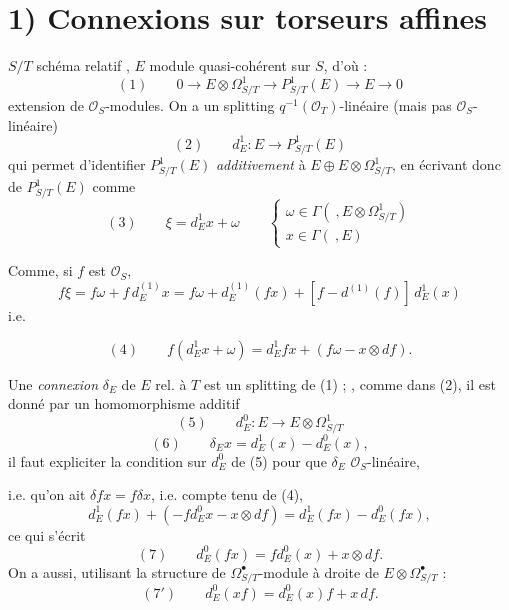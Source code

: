 \documentclass[11pt,a4paper]{article}
\begin{document}
\section{1) Connexions sur torseurs affines}


$S/T$ schéma relatif , $E$ module quasi-cohérent sur $S$, d'où :
\[
(1)\qquad 0 \longrightarrow E \otimes \Omega^1_{S/T} \longrightarrow P^1_{S/T}(E) \longrightarrow E \longrightarrow 0
\]
extension de $\mathcal{O}_S$-modules. On a un splitting $q^{-1}(\mathcal{O}_T)$-linéaire
(mais pas $\mathcal{O}_S$-linéaire)
\[
(2)\qquad d^1_E : E \longrightarrow P^1_{S/T}(E)
\]
qui permet d'identifier $P^1_{S/T}(E)$ \emph{additivement} à
$E \oplus E \otimes \Omega^1_{S/T}$, en écrivant donc \struck{\ill{}} 
de $P^1_{S/T}(E)$   comme
\[
(3)\qquad \xi = d^1_E x + \omega \qquad
\begin{cases} \omega \in \Gamma(\ ,E \otimes \Omega^1_{S/T}) \\ x \in \Gamma(\ ,E) \end{cases}
\]

Comme, si $f$ est  $\mathcal{O}_S$,
\[
f\xi = f\omega + f\,d^{(1)}_E x = f\omega + d^{(1)}_E(fx) + [f - d^{(1)}(f)]\,d^1_E(x)
\]
i.e.

\[
(4)\qquad f(d^1_E x + \omega) = d^1_E fx + (f\omega - x \otimes df) .
\]

Une \emph{connexion} $\delta_E$ de $E$ rel. à $T$ est un splitting 
de (1) ; , comme dans (2), il est donné par un
homomorphisme additif
\[
(5)\qquad d^0_E : E \longrightarrow E \otimes \Omega^1_{S/T}
\]
\ill{}
\[
(6)\qquad \delta_E x = d^1_E(x) - d^0_E(x) ,
\]
il faut expliciter la condition sur $d^0_E$ de (5) pour que $\delta_E$ 
$\mathcal{O}_S$-linéaire,

i.e. qu'on ait $\delta f x = f \delta x$, i.e. compte tenu de (4),
\[
d^1_E(fx) + (-f d^0_E x - x \otimes df) = d^1_E(fx) - d^0_E(fx) ,
\]
ce qui s'écrit
\[
(7)\qquad d^0_E(fx) = f d^0_E(x) + x \otimes df .
\]
On a aussi, utilisant la structure de $\Omega^\bullet_{S/T}$-module à droite de
$E \otimes \Omega^\bullet_{S/T}$ :
\[
(7')\qquad d^0_E(xf) = d^0_E(x) f + x\,df .
\]
\end{document}
